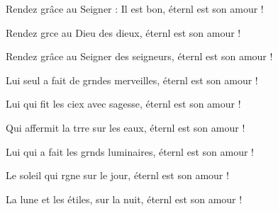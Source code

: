 \item Rendez grâce au Seigner : Il est bon,\psstar{} éternl est son amour !
\item Rendez grce au Dieu des dieux,\psstar{} éternl est son amour !
\item Rendez grâce au Seigner des seigneurs,\psstar{} éternl est son amour !
\item Lui seul a fait de grndes merveilles,\psstar{} éternl est son amour !
\item Lui qui fit les ciex avec sagesse,\psstar{} éternl est son amour !
\item Qui affermit la trre sur les eaux,\psstar{} éternl est son amour !
\item Lui qui a fait les grnds luminaires,\psstar{} éternl est son amour !
\item Le soleil qui rgne sur le jour,\psstar{} éternl est son amour !
\item La lune et les étiles, sur la nuit,\psstar{} éternl est son amour !